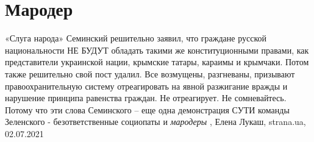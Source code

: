  
 
 
 
 
\chapter{Мародер}
\label{sec:slova.maroder}

«Слуга народа» Семинский решительно заявил, что граждане русской национальности
НЕ БУДУТ обладать такими же конституционными правами, как представители
украинской нации, крымские татары, караимы и крымчаки.  Потом также решительно
свой пост удалил.  Все возмущены, разгневаны, призывают правоохранительную
систему отреагировать на явной разжигание вражды и нарушение принципа равенства
граждан.  Не отреагирует. Не сомневайтесь.  Потому что эти слова Семинского –
еще одна демонстрация СУТИ команды Зеленского - безответственные социопаты и
\emph{мародеры}
, 
Елена Лукаш, strana.ua, 02.07.2021
